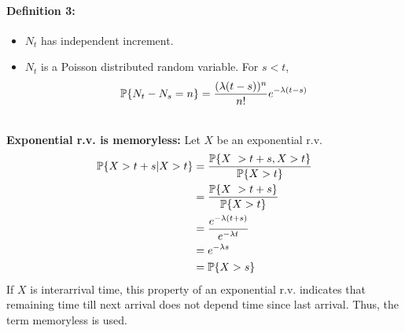\documentclass[a4paper,10pt,english]{article}
\begin{document}
\paragraph{Definition 3:}{
\begin{itemize}
\item $N_t$ has independent increment.
\item $N_t$ is a Poisson distributed random variable. For $s < t$, 
	\begin{align*}
	\P\{N_t - N_s = n\} = \frac{(\lambda (t-s))^n}{n!} e^{-\lambda (t-s)}
	\end{align*}
\end{itemize}
}
\ \\
\textbf{Exponential r.v. is memoryless:} Let $X$ be an exponential r.v.
\begin{align*}
\P\{X > t+s|X>t\} &= \frac{\P\{X\ > t+s,X>t\}}{\P\{X>t\}} \\
&= \frac{\P\{X\ > t+s\}}{\P\{X>t\}} \\
&= \frac{e^{-\lambda (t+s)}}{e^{-\lambda t}} \\
&= e^{-\lambda s} \\
&= \P\{X > s\} 
\end{align*}
If $X$ is interarrival time, this property of an exponential r.v. indicates that remaining time till next arrival does not depend time since last arrival. Thus, the term memoryless is used.
\end{document}
